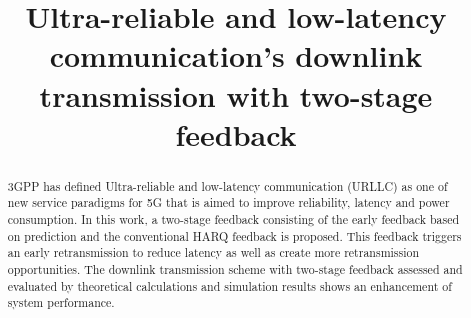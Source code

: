 \documentclass[conference]{IEEEtran}
\begin{document}
\title{Ultra-reliable and low-latency communication's downlink transmission with two-stage feedback\\
}

\author{
\and
{}
}

\maketitle

\begin{abstract}
3GPP has defined Ultra-reliable and low-latency communication (URLLC) as one of new service paradigms for 5G that is aimed to improve reliability, latency and power consumption. In this work, a two-stage feedback consisting of the early feedback based on prediction and the conventional HARQ feedback is proposed. This feedback triggers an early retransmission to reduce latency as well as create more retransmission opportunities. The downlink transmission scheme with two-stage feedback assessed and evaluated by theoretical calculations and simulation results shows an enhancement of system performance.
\end{abstract}
\end{document}
